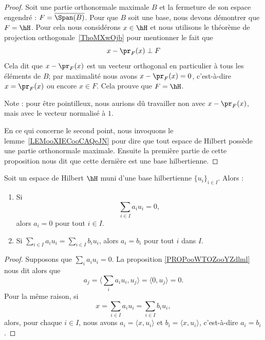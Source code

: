\begin{proof}
	Soit une partie orthonormale maximale \( B\) et la fermeture de son espace engendré : \( F=\overline{ \Span(B) }\). Pour que \( B\) soit une base, nous devons démontrer que \( F=\hH\). Pour cela nous considérons \( x\in \hH\) et nous utilisons le théorème de projection orthogonale~\ref{ThoMXwOjb} pour mentionner le fait que
	\begin{equation}
		x-\pr_F(x)\perp F
	\end{equation}
	Cela dit que \( x-\pr_F(x)\) est un vecteur orthogonal en particulier à tous les éléments de \( B\); par maximalité nous avons \( x-\pr_F(x)=0\), c'est-à-dire \( x=\pr_F(x)\) ou encore \( x\in F\). Cela prouve que \( F=\hH\).

	Note : pour être pointilleux, nous aurions dû travailler non avec \( x-\pr_F(x)\), mais avec le vecteur normalisé à \( 1\).

	En ce qui concerne le second point, nous invoquons le lemme~\ref{LEMooXIECooCAQeJN} pour dire que tout espace de Hilbert possède une partie orthonormale maximale. Ensuite la première partie de cette proposition nous dit que cette dernière est une base hilbertienne.
\end{proof}

\begin{proposition}        \label{PROPooEYRSooCRPjdK}
	Soit un espace de Hilbert \( \hH\) muni d'une base hilbertienne \( \{ u_i \}_{i\in I}\). Alors :
	\begin{enumerate}
		\item
		      Si
		      \begin{equation}
			      \sum_{i\in I}a_iu_i=0,
		      \end{equation}
		      alors \( a_i=0\) pour tout \( i\in I\).
		\item
		      Si \( \sum_{i\in I}a_iu_i=\sum_{i\in I}b_iu_i\), alors \( a_i=b_i\) pour tout \( i\) dans \( I\).
	\end{enumerate}
\end{proposition}

\begin{proof}
	Supposons que \( \sum_ia_iu_i=0\). La proposition \ref{PROPooWTOZooYZdlml} nous dit alors que
	\begin{equation}
		a_j=\langle \sum_ia_iu_i, u_j\rangle =\langle 0, u_j\rangle =0.
	\end{equation}
	Pour la même raison, si
	\begin{equation}
		x=\sum_{i\in I}a_iu_i=\sum_{i\in I}b_iu_i,
	\end{equation}
	alors, pour chaque \( i\in I\), nous avons \( a_i=\langle x, u_i\rangle \) et \( b_i=\langle x, u_i\rangle \), c'est-à-dire \( a_i=b_i\).
\end{proof}

